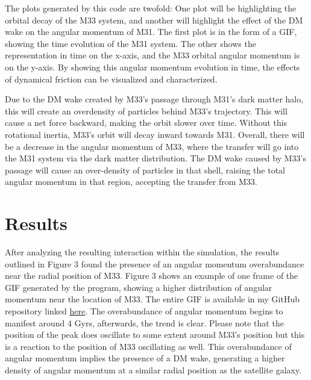 \documentclass[fleqn,usenatbib]{mnras}
\begin{document}
The plots generated by this code are twofold: One plot will be highlighting the orbital decay of the M33 system, and another will highlight the effect of the DM wake on the angular momentum of M31. The first plot is in the form of a GIF, showing the time evolution of the M31 system. The other shows the representation in time on the x-axis, and the M33 orbital angular momentum is on the y-axis. By showing this angular momentum evolution in time, the effects of dynamical friction can be visualized and characterized. 

\vspace{10pt}

Due to the DM wake created by M33's passage through M31's dark matter halo, this will create an overdensity of particles behind M33's trajectory. This will cause a net force backward, making the orbit slower over time. Without this rotational inertia, M33's orbit will decay inward towards M31. Overall, there will be a decrease in the angular momentum of M33, where the transfer will go into the M31 system via the dark matter distribution. The DM wake caused by M33's passage will cause an over-density of particles in that shell, raising the total angular momentum in that region, accepting the transfer from M33. 

\section{Results}

After analyzing the resulting interaction within the simulation, the results outlined in Figure 3 found the presence of an angular momentum overabundance near the radial position of M33. Figure 3 shows an example of one frame of the GIF generated by the program, showing a higher distribution of angular momentum near the location of M33. The entire GIF is available in my GitHub repository linked \href{https://github.com/ThomasaturnV/ASTR400B/blob/main/ResearchAssignments/FinalProject/M31_AngularMomentumEvolution.gif}{here}. The overabundance of angular momentum begins to manifest around 4 Gyrs, afterwards, the trend is clear. Please note that the position of the peak does oscillate to some extent around M33's position but this is a reaction to the position of M33 oscillating as well.  This overabundance of angular momentum implies the presence of a DM wake, generating a higher density of angular momentum at a similar radial position as the satellite galaxy.
\end{document}
